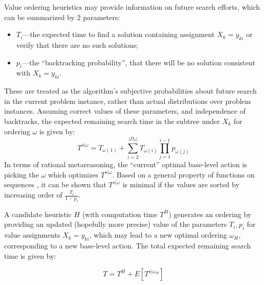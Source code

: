 Value ordering heuristics may provide information on future search
efforts, which can be summarized by 2 parameters:
\begin{itemize}
\item  $T_i$---the expected time to find a solution containing
  assignment  $X_k=y_{ki}$ or verify that there are no such solutions;
\item  $p_i$---the ``backtracking probability'', that there will be no solution
consistent with $X_k=y_{ki}$.
\end{itemize}
These are treated as the algorithm's subjective probabilities about future search
in the current problem instance, rather than actual distributions over problem instances.
Assuming correct values of these parameters, and independence of backtracks,
the expected remaining search time in the subtree under $X_k$ for ordering $\omega$ is given by:
\begin{equation}
\label{eq:expected-search-time}
T^{s|\omega}=T_{\omega(1)}+\sum_{i=2}^{|D_k|}T_{\omega(i)}\prod_{j=1}^{i-1}p_{\omega(j)}
\end{equation}
In terms of rational metareasoning, the ``current'' optimal base-level action is picking
the $\omega $ which optimizes $T^{s|\omega}$.
Based on a general property of functions on sequences \cite{MonmaSidney.sequencing}, it can
be shown that $T^{s|\omega}$ is minimal if 
the values are sorted  by increasing order of $\frac {T_i} {1-p_i}$.

A candidate heuristic $H$ (with computation time $T^H$)  generates
an ordering by providing an updated (hopefully more precise)
value of the parameters $T_i, p_i$ for value assignments
$X_k=y_{ki}$, which may lead to a new optimal ordering $\omega_H$,
corresponding to a new base-level action.  The total expected
remaining search time  is given by:

\begin{equation}
\label{eq:net-expected-time}
T=T^H+E[T^{s|\omega_H}]
\end{equation}

